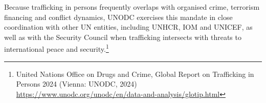Because trafficking in persons frequently overlaps with organised crime, terrorism financing and conflict dynamics, UNODC exercises this mandate in close coordination with other UN entities, including UNHCR, IOM and UNICEF, as well as with the Security Council when trafficking intersects with threats to international peace and security.\footnote{United Nations Office on Drugs and Crime, Global Report on Trafficking in Persons 2024 (Vienna: UNODC, 2024) \url{https://www.unodc.org/unodc/en/data-and-analysis/glotip.html}}
